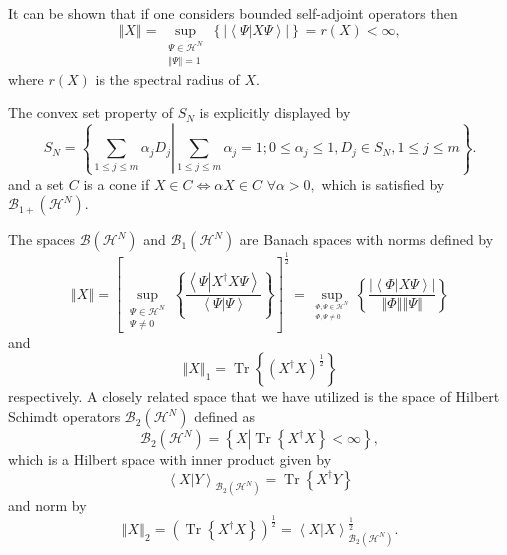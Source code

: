 \documentclass[aps,preprint]{revtex4}%
\begin{document}
It can be shown that if one considers bounded self-adjoint operators then
\begin{equation}
\left\Vert X\right\Vert =\sup_{\substack{\Psi\in\mathcal{H}^{N}\\\left\Vert
\Psi\right\Vert =1}}\left\{  \left\vert \left\langle \Psi\left\vert
X\Psi\right.  \right\rangle \right\vert \right\}  =r\left(  X\right)  <\infty,
\end{equation}
where $r\left(  X\right)  $ is the spectral radius of $X$.

The convex set property of $S_{N}$ is explicitly displayed by
\begin{equation}
S_{N}=\left\{  \left.  \sum_{1\leq j\leq m}\alpha_{j}D_{j}\right\vert
\sum_{1\leq j\leq m}\alpha_{j}=1;0\leq\alpha_{j}\leq1,D_{j}\in S_{N},1\leq
j\leq m\right\}  .
\end{equation}
and a set $C$ is a cone if $X\in C\Leftrightarrow\alpha X\in C$ $\forall
\alpha>0,$ which is satisfied by $\mathcal{B}_{1+}\left(  \mathcal{H}%
^{N}\right)  .$

The spaces $\mathcal{B}\left(  \mathcal{H}^{N}\right)  $ and $\mathcal{B}%
_{1}\left(  \mathcal{H}^{N}\right)  $ are Banach spaces with norms defined by
\begin{equation}
\left\Vert X\right\Vert =\left[  \sup_{\substack{\Psi\in\mathcal{H}^{N}%
\\\Psi\neq0}}\left\{  \frac{\left\langle \Psi\left\vert X^{\dagger}%
X\Psi\right.  \right\rangle }{\left\langle \Psi\left\vert \Psi\right.
\right\rangle }\right\}  \right]  ^{\frac{1}{2}}=\sup_{_{\substack{\Phi
,\Psi\in\mathcal{H}^{N}\\\Phi,\Psi\neq0}}}\left\{  \frac{\left\vert
\left\langle \Phi\left\vert X\Psi\right.  \right\rangle \right\vert
}{\left\Vert \Phi\right\Vert \left\Vert \Psi\right\Vert }\right\}
\end{equation}
and
\begin{equation}
\left\Vert X\right\Vert _{1}=\operatorname{Tr}\left\{  \left(  X^{\dagger
}X\right)  ^{\frac{1}{2}}\right\}
\end{equation}
respectively. A closely related space that we have utilized is the space of
Hilbert Schimdt operators $\mathcal{B}_{2}\left(  \mathcal{H}^{N}\right)  $
defined as
\begin{equation}
\mathcal{B}_{2}\left(  \mathcal{H}^{N}\right)  =\left\{  X\left\vert
\operatorname{Tr}\left\{  X^{\dagger}X\right\}  <\infty\right.  \right\}  ,
\end{equation}
which is a Hilbert space with inner product given by
\begin{equation}
\left\langle X\left\vert Y\right.  \right\rangle _{\mathcal{B}_{2}\left(
\mathcal{H}^{N}\right)  }=\operatorname{Tr}\left\{  X^{\dagger}Y\right\}
\end{equation}
and norm by
\begin{equation}
\left\Vert X\right\Vert _{2}=\left(  \operatorname{Tr}\left\{  X^{\dagger
}X\right\}  \right)  ^{\frac{1}{2}}=\left\langle X\left\vert X\right.
\right\rangle _{\mathcal{B}_{2}\left(  \mathcal{H}^{N}\right)  }^{\frac{1}{2}%
}.
\end{equation}
\end{document}
